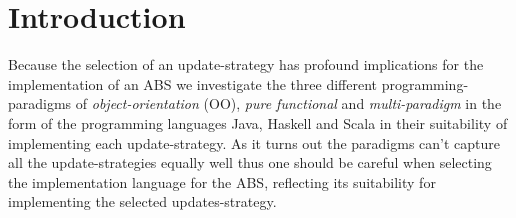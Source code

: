 \section{Introduction}
Because the selection of an update-strategy has profound implications for the implementation of an ABS we investigate the three different programming-paradigms of \textit{object-orientation} (OO), \textit{pure functional} and \textit{multi-paradigm} in the form of the programming languages Java, Haskell and Scala in their suitability of implementing each update-strategy. As it turns out the paradigms can't capture all the update-strategies equally well thus one should be careful when selecting the implementation language for the ABS, reflecting its suitability for implementing the selected updates-strategy.